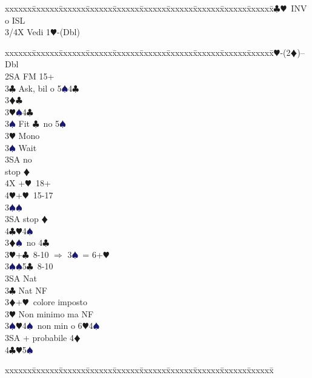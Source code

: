 \documentclass[a4paper,italian]{article}
\newcommand{\BC}{\textcolor{OliveGreen}{$\clubsuit$}}
\newcommand{\BD}{\textcolor{RedOrange}{$\vardiamondsuit$}}
\newcommand{\BH}{\textcolor{Red2}{$\varheartsuit${}}}
\newcommand{\BS}{\textcolor{MidnightBlue}{$\spadesuit${}}}
\newenvironment{bidtable}
{\begin{tabbing}

    xxxxxx\=xxxxxx\=xxxxxx\=xxxxxx\=xxxxxx\=xxxxxx\=xxxxxx\=xxxxxx\=xxxxxx\=xxxxxx\=\kill}
{\end{tabbing} }%
\begin{document}
\begin{multicols}{2}
\begin{bidtable}
        3\BC{}\BH\ INV o ISL\\
        3/4X \> Vedi 1\BH -(Dbl)\-
    \end{bidtable}
    \columnbreak
    \begin{bidtable}
        1\BH-(2\BD)--\+\\
        Dbl\+\\
        2SA \> FM 15+\+\\
        3\BC \> Ask, bil o 5\BS4\BC\+\\
        3\BD {}\BC \+\\
        3\BH {}\BS 4\BC \\
        3\BS \> Fit \BC\ no 5\BS \-\\
        3\BH \> Mono\+\\
        3\BS \> Wait\+\\
        3SA  no\+\\\-stop \BD \\
        4X +\BH\ 18+\\
        4\BH {}+\BH\ 15-17\-\-\\
        3\BS {}\BS \\
        3SA  stop \BD \\
        4\BC {}\BH 4\BS \-\\
        3\BD {}\BS\ no 4\BC \\
        3\BH {}+\BC\ 8-10 $\Rightarrow$ 3\BS\ = 6+\BH\\
        3\BS {}\BS 5\BC\ 8-10\\
        3SA \> Nat\-\\
        3\BC \> Nat NF\\
        3\BD {}+\BH\ colore imposto\\
        3\BH \> Non minimo ma NF\\
        3\BS {}\BH 4\BS\ non min o 6\BH 4\BS \\
        3SA + probabile 4\BD \\
        4\BC {}\BH 5\BS \-\\
    \end{bidtable}
    \columnbreak
    \begin{bidtable}


\end{bidtable}
\end{multicols}
\end{document}
